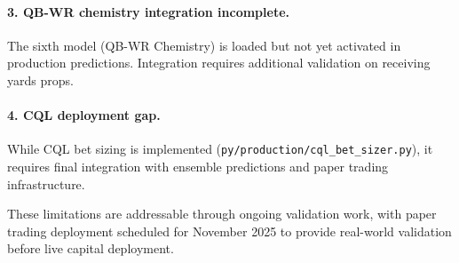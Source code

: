 \paragraph{3. QB-WR chemistry integration incomplete.}
The sixth model (QB-WR Chemistry) is loaded but not yet activated in production predictions. Integration requires additional validation on receiving yards props.

\paragraph{4. CQL deployment gap.}
While CQL bet sizing is implemented (\texttt{py/production/cql\_bet\_sizer.py}), it requires final integration with ensemble predictions and paper trading infrastructure.

These limitations are addressable through ongoing validation work, with paper trading deployment scheduled for November 2025 to provide real-world validation before live capital deployment.
